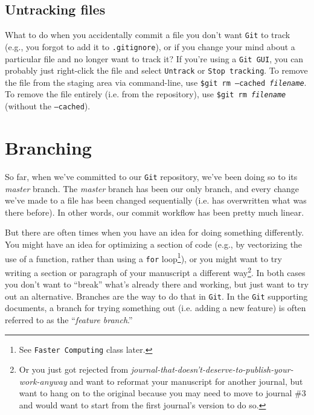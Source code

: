 \documentclass[12pt,letterpaper]{article}
\begin{document}
\subsection{Untracking files}
What to do when you accidentally commit a file you don't want \texttt{Git} to track (e.g., you forgot to add it to \texttt{.gitignore}), or if you change your mind about a particular file and no longer want to track it?
If you're using a \texttt{Git GUI}, you can probably just right-click the file and select \texttt{Untrack} or \texttt{Stop tracking}.
To remove the file from the staging area via command-line, use \texttt{\$git rm --cached \emph{filename}}.  To remove the file entirely (i.e. from the repository), use \texttt{\$git rm \emph{filename}} (without the \texttt{--cached}).


\section{Branching}
So far, when we've committed to our \texttt{Git} repository, we've been doing so to its \emph{master} branch.
The \emph{master} branch has been our only branch, and every change we've made to a file has been changed sequentially (i.e. has overwritten what was there before).
In other words, our commit workflow has been pretty much linear.

But there are often times when you have an idea for doing something differently.
You might have an idea for optimizing a section of code (e.g., by vectorizing the use of a function, rather than using a \texttt{for} loop\footnote{See \texttt{Faster Computing} class later.}), or you might want to try writing a section or paragraph of your manuscript a different way\footnote{Or you just got rejected from \emph{journal-that-doesn't-deserve-to-publish-your-work-anyway} and want to reformat your manuscript for another journal, but want to hang on to the original because you may need to move to journal \#3 and would  want to start from the first journal's version to do so.}.
In both cases you don't want to ``break'' what's already there and working, but just want to try out an alternative.
Branches are the way to do that in \texttt{Git}.
In the \texttt{Git} supporting documents, a branch for trying something out (i.e. adding a new feature) is often referred to as the ``\emph{feature branch}.''
\end{document}
